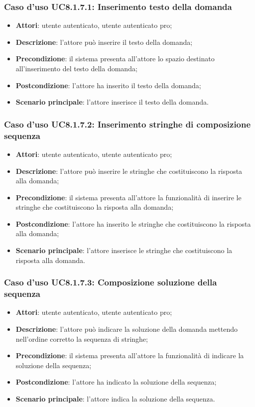 \subsubsection{Caso d'uso UC8.1.7.1: Inserimento testo della domanda}
	\begin{itemize}
		\item \textbf{Attori}: utente autenticato, utente autenticato pro;
		\item \textbf{Descrizione}: l'attore può inserire il testo della domanda;
		\item\textbf{Precondizione}: il sistema presenta all'attore lo spazio destinato all'inserimento del testo della domanda;
		\item \textbf{Postcondizione}: l'attore ha inserito il testo della domanda;
		\item\textbf{Scenario principale}: l'attore inserisce il testo della domanda.
	\end{itemize}
	
\subsubsection{Caso d'uso UC8.1.7.2: Inserimento stringhe di composizione sequenza}
	\begin{itemize}
		\item \textbf{Attori}: utente autenticato, utente autenticato pro;
		\item \textbf{Descrizione}: l'attore può inserire le stringhe che costituiscono la risposta alla domanda;
		\item\textbf{Precondizione}: il sistema presenta all'attore la funzionalità di inserire le stringhe che costituiscono la risposta alla domanda;
		\item \textbf{Postcondizione}: l'attore ha inserito le stringhe che costituiscono la risposta alla domanda;
		\item\textbf{Scenario principale}: l'attore inserisce le stringhe che costituiscono la risposta alla domanda.
	\end{itemize}
	
\subsubsection{Caso d'uso UC8.1.7.3: Composizione soluzione della sequenza}
	\begin{itemize}
		\item \textbf{Attori}: utente autenticato, utente autenticato pro;
		\item \textbf{Descrizione}: l'attore può indicare la soluzione della domanda mettendo nell'ordine corretto la sequenza di stringhe;
		\item\textbf{Precondizione}: il sistema presenta all'attore la funzionalità di indicare la soluzione della sequenza;
		\item \textbf{Postcondizione}: l'attore ha indicato la soluzione della sequenza;
		\item\textbf{Scenario principale}: l'attore indica la soluzione della sequenza. 
	\end{itemize}
